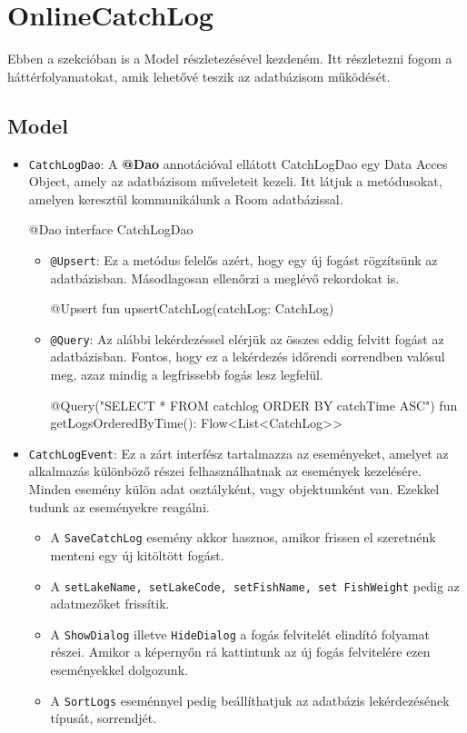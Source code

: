 \section{OnlineCatchLog}

Ebben a szekcióban is a Model részletezésével kezdeném. Itt részletezni fogom a háttérfolyamatokat, amik lehetővé teszik az adatbázisom működését.
\subsection{Model}
\begin{itemize}
    \item \texttt{CatchLogDao}: A \textbf{@Dao} annotációval ellátott CatchLogDao egy Data Acces Object\cite{dao}, amely az adatbázisom műveleteit kezeli. Itt látjuk a metódusokat, amelyen keresztül kommunikálunk a Room adatbázissal.
    
\newpage
    
    \begin{java}[ caption = {CatchLogDao.kt részlet.}]
    @Dao
    interface CatchLogDao{
    
    }
    \end{java}
    \begin{itemize}
        \item \texttt{@Upsert}: Ez a metódus felelős azért, hogy egy új fogást rögzítsünk az adatbázisban. Másodlagosan ellenőrzi a meglévő rekordokat is.
\begin{java}
@Upsert
fun upsertCatchLog(catchLog: CatchLog)
\end{java}
        \item \texttt{@Query}: Az alábbi lekérdezéssel elérjük az összes eddig felvitt fogást az adatbázisban. Fontos, hogy ez a lekérdezés időrendi sorrendben valósul meg, azaz mindig a legfrissebb fogás lesz legfelül.
\begin{java}
@Query("SELECT * FROM catchlog ORDER BY catchTime ASC")
fun getLogsOrderedByTime(): Flow<List<CatchLog>>
\end{java}
    \end{itemize}

    \item \texttt{CatchLogEvent}: Ez a zárt interfész tartalmazza az eseményeket, amelyet az alkalmazás különböző részei felhasználhatnak az események kezelésére.
    Minden esemény külön adat osztályként, vagy objektumként van. Ezekkel tudunk az eseményekre reagálni.
    \begin{itemize}
        \item A \texttt{SaveCatchLog} esemény akkor hasznos, amikor frissen el szeretnénk menteni egy új kitöltött fogást.
        \item A \texttt{setLakeName, setLakeCode, setFishName, set FishWeight} pedig az adatmezőket frissítik.
        \item A \texttt{ShowDialog} illetve \texttt{HideDialog} a fogás felvitelét elindító folyamat részei. Amikor a képernyőn rá kattintunk az új fogás felvitelére ezen eseményekkel dolgozunk.
        \item A \texttt{SortLogs} eseménnyel pedig beállíthatjuk az adatbázis lekérdezésének típusát, sorrendjét.
        

\end{itemize}
\end{itemize}
